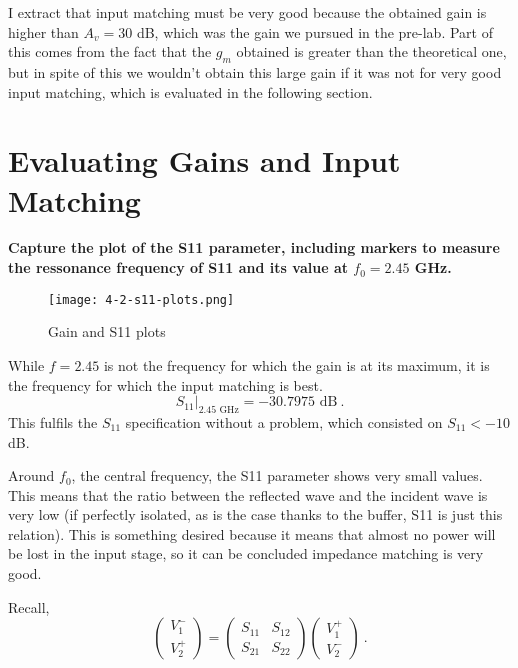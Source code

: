 \noindent I extract that input matching must be very good because the obtained gain is higher than $A_v = 30$ dB, which was the gain we pursued in the pre-lab. Part of this comes from the fact that the $g_m$ obtained is greater than the theoretical one, but in spite of this we wouldn't obtain this large gain if it was not for very good input matching, which is evaluated in the following section.




\section{Evaluating Gains and Input Matching}
\begin{pexbox}{}
   \noindent \textbf{Capture the plot of the S11 parameter, including markers to measure the ressonance frequency of S11 and its value at $f_0 = 2.45$ GHz.}
\end{pexbox}

\begin{figure} [H] \centering
   \texttt{[image: 4-2-s11-plots.png]}
   \caption{Gain and S11 plots}
\end{figure}

\noindent While $f=2.45$ is not the frequency for which the gain is at its maximum, it is the frequency for which the input matching is best.
\begin{equation}
   S_{11}|_{2.45 \text{ GHz}} = -30.7975 \text{ dB} \ .
\end{equation}
\noindent This fulfils the $S_{11}$ specification without a problem, which consisted on $S_{11} < -10$ dB. 

\noindent Around $f_0$, the central frequency, the S11 parameter shows very small values. This means that the ratio between the reflected wave and the incident wave is very low (if perfectly isolated, as is the case thanks to the buffer, S11 is just this relation). This is something desired because it means that almost no power will be lost in the input stage, so it can be concluded impedance matching is very good. 

\noindent Recall,
\begin{equation}
   \begin{pmatrix}
      V_1^- \\
      V_2^+
   \end{pmatrix} = \begin{pmatrix}
      S_{11} & S_{12} \\
      S_{21} & S_{22} 
   \end{pmatrix} \begin{pmatrix}
      V_1^+ \\
      V_2^-
   \end{pmatrix} \ .
\end{equation}



